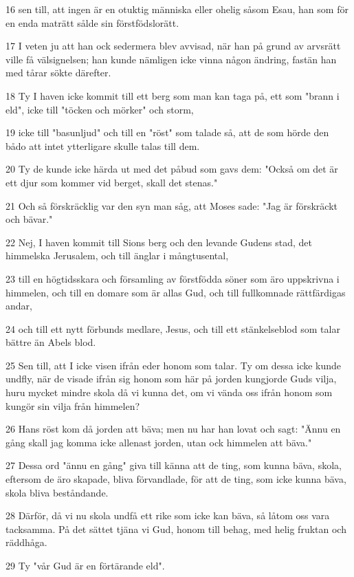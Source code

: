 \par 16 sen till, att ingen är en otuktig människa eller ohelig såsom Esau, han som för en enda maträtt sålde sin förstfödslorätt.
\par 17 I veten ju att han ock sedermera blev avvisad, när han på grund av arvsrätt ville få välsignelsen; han kunde nämligen icke vinna någon ändring, fastän han med tårar sökte därefter.
\par 18 Ty I haven icke kommit till ett berg som man kan taga på, ett som "brann i eld", icke till "töcken och mörker" och storm,
\par 19 icke till "basunljud" och till en "röst" som talade så, att de som hörde den bådo att intet ytterligare skulle talas till dem.
\par 20 Ty de kunde icke härda ut med det påbud som gavs dem: "Också om det är ett djur som kommer vid berget, skall det stenas."
\par 21 Och så förskräcklig var den syn man såg, att Moses sade: "Jag är förskräckt och bävar."
\par 22 Nej, I haven kommit till Sions berg och den levande Gudens stad, det himmelska Jerusalem, och till änglar i mångtusental,
\par 23 till en högtidsskara och församling av förstfödda söner som äro uppskrivna i himmelen, och till en domare som är allas Gud, och till fullkomnade rättfärdigas andar,
\par 24 och till ett nytt förbunds medlare, Jesus, och till ett stänkelseblod som talar bättre än Abels blod.
\par 25 Sen till, att I icke visen ifrån eder honom som talar. Ty om dessa icke kunde undfly, när de visade ifrån sig honom som här på jorden kungjorde Guds vilja, huru mycket mindre skola då vi kunna det, om vi vända oss ifrån honom som kungör sin vilja från himmelen?
\par 26 Hans röst kom då jorden att bäva; men nu har han lovat och sagt: "Ännu en gång skall jag komma icke allenast jorden, utan ock himmelen att bäva."
\par 27 Dessa ord "ännu en gång" giva till känna att de ting, som kunna bäva, skola, eftersom de äro skapade, bliva förvandlade, för att de ting, som icke kunna bäva, skola bliva beståndande.
\par 28 Därför, då vi nu skola undfå ett rike som icke kan bäva, så låtom oss vara tacksamma. På det sättet tjäna vi Gud, honom till behag, med helig fruktan och räddhåga.
\par 29 Ty "vår Gud är en förtärande eld".

